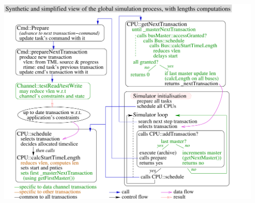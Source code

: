 \documentclass[a4paper,11pt]{article}
\begin{document}
\includegraphics[width=15.5cm]{images/busTime.pdf}
\end{document}
